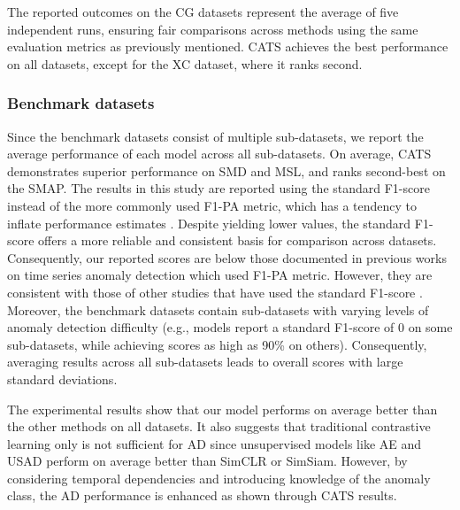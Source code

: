 The reported outcomes on the \ac{CG} datasets represent the average of five independent runs, ensuring fair comparisons across methods using the same evaluation metrics as previously mentioned. CATS achieves the best performance on all datasets, except for the XC dataset, where it ranks second.


\subsubsection{Benchmark datasets}

Since the benchmark datasets consist of multiple sub-datasets, we report the average performance of each model across all sub-datasets. On average, CATS demonstrates superior performance on SMD and MSL, and ranks second-best on the SMAP. The results in this study are reported using the standard F1-score instead of the more commonly used F1-PA metric, which has a tendency to inflate performance estimates \cite{DARBAN2025110874, kim2023contrastive, Ky2023MLMF}. Despite yielding lower values, the standard F1-score offers a more reliable and consistent basis for comparison across datasets. Consequently, our reported scores are below those documented in previous works on time series anomaly detection which used F1-PA metric. However, they are consistent with those of other studies that have used the standard F1-score \cite{DARBAN2025110874}. Moreover, the benchmark datasets contain sub-datasets with varying levels of anomaly detection difficulty (e.g., models report a standard F1-score of 0 on some sub-datasets, while achieving scores as high as 90\% on others). Consequently, averaging results across all sub-datasets leads to overall scores with large standard deviations.





The experimental results show that our model performs on average better than the other methods on all datasets. It also suggests that traditional contrastive learning only is not sufficient for AD since unsupervised models like AE and USAD perform on average better than SimCLR or SimSiam. However, by considering temporal dependencies and introducing knowledge of the anomaly class, the AD performance is enhanced as shown through CATS results.

